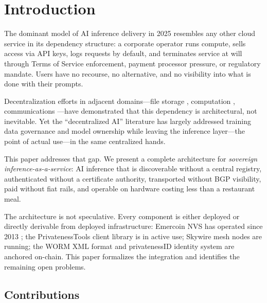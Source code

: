 \documentclass[11pt,a4paper]{article}
\theoremstyle{definition}
\begin{document}
\newpage

\section{Introduction}

The dominant model of AI inference delivery in 2025 resembles any other
cloud service in its dependency structure: a corporate operator runs compute, sells access via
API keys, logs requests by default, and terminates service at will through Terms of
Service enforcement, payment processor pressure, or regulatory mandate.  Users
have no recourse, no alternative, and no visibility into what is done with their
prompts.

Decentralization efforts in adjacent domains---file storage \cite{ipfs},
computation \cite{ethereum}, communications \cite{skywire}---have demonstrated
that this dependency is architectural, not inevitable.  Yet the ``decentralized AI''
literature has largely addressed training data governance and model ownership while
leaving the inference layer---the point of actual use---in the same centralized
hands.

This paper addresses that gap.  We present a complete architecture for
\emph{sovereign inference-as-a-service}: AI inference that is discoverable without
a central registry, authenticated without a certificate authority, transported
without BGP visibility, paid without fiat rails, and operable on hardware costing
less than a restaurant meal.

The architecture is not speculative.  Every component is either deployed or
directly derivable from deployed infrastructure: Emercoin NVS has operated since
2013 \cite{emercoin}; the PrivatenessTools client library is in active use;
Skywire mesh nodes are running; the WORM XML format and privatenessID identity
system are anchored on-chain.  This paper formalizes the integration and
identifies the remaining open problems.

\subsection{Contributions}
\end{document}
